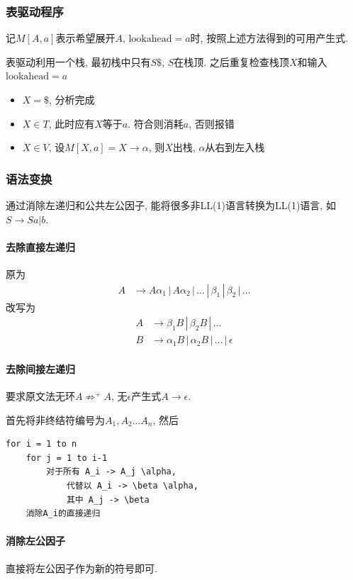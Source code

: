 \documentclass{ctexart}
\begin{document}
\subsubsection{表驱动程序}
    记$M[A, a]$表示希望展开$A$, $\text{lookahead} = a$时, 按照上述方法得到的可用产生式.\par
    表驱动利用一个栈, 最初栈中只有$S\$$, $S$在栈顶. 之后重复检查栈顶$X$和输入$\text{lookahead} = a$ \begin{itemize}
        \item $X = \$$, 分析完成
        \item $X \in T$, 此时应有$X$等于$a$. 符合则消耗$a$, 否则报错
        \item $X \in V$, 设$M[X, a] = X \to \alpha$, 则$X$出栈, $\alpha$从右到左入栈
    \end{itemize}
\subsubsection{语法变换}
    通过消除左递归和公共左公因子, 能将很多非LL(1)语言转换为LL(1)语言, 如$S \to Sa | b$.
\paragraph{去除直接左递归} 原为\begin{align*}
        A & \to A \alpha_1 \,|\, A \alpha_2 \,|\, \ldots \,|\, \beta_1 \,|\, \beta_2 \,|\, \ldots
    \end{align*}改写为\begin{align*}
        A &\to \beta_1 B \,|\, \beta_2 B \,|\, \ldots \\
        B &\to \alpha_1 B \,|\, \alpha_2 B \,|\, \ldots \,|\, \epsilon
    \end{align*}
\paragraph{去除间接左递归} 要求原文法无环$A \not\Rightarrow^+ A$, 无$\epsilon$产生式$A \to \epsilon$.\par
    首先将非终结符编号为$A_1, A_2 \ldots A_n$, 然后\begin{verbatim} 
for i = 1 to n
    for j = 1 to i-1
        对于所有 A_i -> A_j \alpha,
            代替以 A_i -> \beta \alpha,
            其中 A_j -> \beta
    消除A_i的直接递归
\end{verbatim}
\paragraph{消除左公因子} 直接将左公因子作为新的符号即可.
\end{document}
